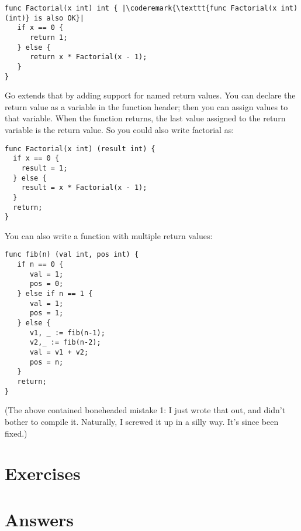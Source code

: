 \begin{lstlisting}
func Factorial(x int) int { |\coderemark{\texttt{func Factorial(x int) (int)} is also OK}|
   if x == 0 {
      return 1;	
   } else {
      return x * Factorial(x - 1);
   }
}
\end{lstlisting}

Go extends that by adding support for named return values. You can 
declare the return value as a variable in the function header; then you
can assign values to that variable. When the function returns, the last
value assigned to the return variable is the return value. So you could
also write factorial as:

\begin{lstlisting}
func Factorial(x int) (result int) {
  if x == 0 {
    result = 1;	
  } else {
    result = x * Factorial(x - 1);
  }
  return;
}
\end{lstlisting}
You can also write a function with multiple return values:

\begin{lstlisting}
func fib(n) (val int, pos int) {
   if n == 0 {
      val = 1;
      pos = 0;
   } else if n == 1 {
      val = 1;
      pos = 1;
   } else {
      v1, _ := fib(n-1);
      v2,_ := fib(n-2);
      val = v1 + v2;
      pos = n;
   }
   return;
}
\end{lstlisting}
(The above contained boneheaded mistake 1: I just wrote that out, and didn't bother to compile it. Naturally, I screwed it up in a silly way. It's since been fixed.)


\section{Exercises}










\cleardoublepage
\section{Answers}
\shipoutAnswer
